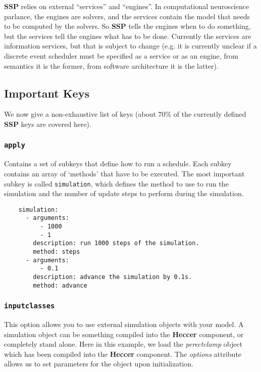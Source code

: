 \documentclass[12pt]{article}
\begin{document}
{\bf SSP} relies on external ``services'' and ``engines''. In computational neuroscience parlance, the engines are solvers, and the services contain the model that needs to be computed by the solvers. So {\bf SSP} tells the engines when to do something, but the services tell the engines what has to be done. Currently the services are information services, but that is subject to change (e.g. it is currently unclear if a discrete event scheduler must be specified as a service or as an engine, from semantics it is the former, from software architecture it is the latter).

\subsection*{Important Keys}

We now give a non-exhaustive list of keys (about 70\% of the currently defined {\bf SSP} keys are covered here).

\subsubsection*{\tt apply}

Contains a set of subkeys that define how to run a schedule. Each subkey contains an array of `methods' that have to be executed. The most important subkey is called {\tt simulation}, which defines the method to use to run the simulation and the number of update steps to perform during the simulation. 
\begin{verbatim}
    simulation:
      - arguments:
          - 1000
          - 1
        description: run 1000 steps of the simulation.
        method: steps
      - arguments:
          - 0.1
        description: advance the simulation by 0.1s.
        method: advance
\end{verbatim}

\subsubsection*{\tt inputclasses}

This option allows you to use external simulation objects with your model. A simulation object can be something compiled into the {\bf Heccer} component, or completely stand alone. Here in this example, we load the {\it perectclamp} object which has been compiled into the {\bf Heccer} component. The {\it options} attribute allows us to set parameters for the object upon initialization. 
\end{document}
